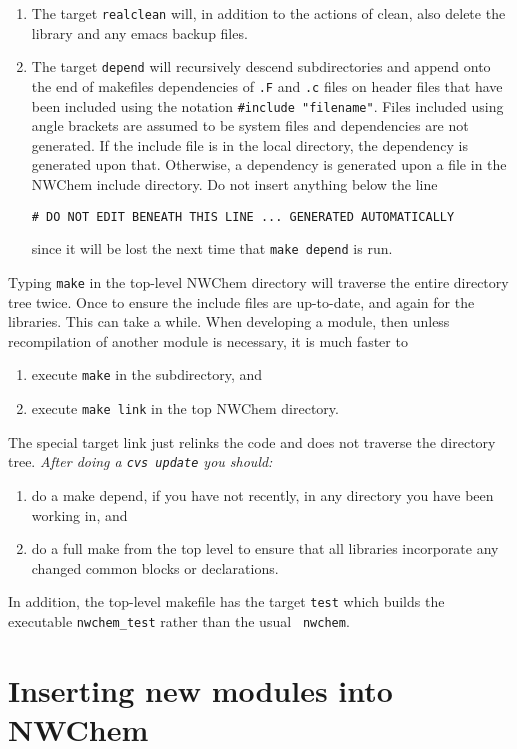 \begin{enumerate}
\item The target {\tt realclean} will, in addition to the actions of
  clean, also delete the library and any emacs backup files.
\item The target {\tt depend} will recursively descend subdirectories
  and append onto the end of makefiles dependencies of \verb+.F+ and
  \verb+.c+ files on header files that have been included using the
  notation \verb+#include "filename"+.  Files included using angle
  brackets are assumed to be system files and dependencies are not
  generated.  If the include file is in the local directory, the
  dependency is generated upon that.  Otherwise, a dependency is
  generated upon a file in the NWChem include directory.
  Do not insert anything below the line
\begin{verbatim}
# DO NOT EDIT BENEATH THIS LINE ... GENERATED AUTOMATICALLY
\end{verbatim}
  since it will be lost the next time that \verb+make depend+
  is run.
\end{enumerate}

Typing {\tt make} in the top-level NWChem directory will traverse the
entire directory tree twice.  Once to ensure the include files are
up-to-date, and again for the libraries.  This can take a while.
When developing a module, then unless recompilation of another module
is necessary, it is much faster to 
\begin{enumerate}
\item execute {\tt make} in the subdirectory, and
\item execute {\tt make link} in the top NWChem directory.
\end{enumerate}
The special target link just relinks the code and does not traverse
the directory tree.  {\em After doing a \verb+cvs update+ you should:}
\begin{enumerate}
\item do a make depend, if you have not recently, in any directory you
  have been working in, and
\item do a full make from the top level to ensure that all libraries
  incorporate any changed common blocks or declarations.
\end{enumerate}

In addition, the top-level makefile has the target {\tt test} which
builds the executable \verb+nwchem_test+ rather than the usual {\tt
  nwchem}.

\section{Inserting new modules into NWChem}

